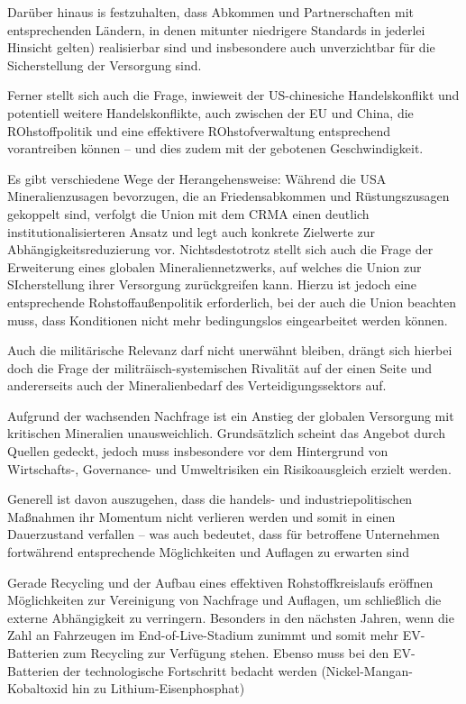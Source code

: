 \documentclass[12pt,a4paper,oneside]{book} %
\begin{document}
{Darüber hinaus is festzuhalten, dass Abkommen und Partnerschaften mit entsprechenden Ländern, in denen mitunter niedrigere Standards in jederlei Hinsicht gelten) realisierbar sind und insbesondere auch unverzichtbar für die Sicherstellung der Versorgung sind.

Ferner stellt sich auch die Frage, inwieweit der US-chinesiche Handelskonflikt und potentiell weitere Handelskonflikte, auch zwischen der EU und China, die ROhstoffpolitik und eine effektivere ROhstofverwaltung entsprechend vorantreiben können -- und dies zudem mit der gebotenen Geschwindigkeit.

Es gibt verschiedene Wege der Herangehensweise: Während die USA Mineralienzusagen bevorzugen, die an Friedensabkommen und Rüstungszusagen gekoppelt sind, verfolgt die Union mit dem CRMA einen deutlich institutionalisierteren Ansatz und legt auch konkrete Zielwerte zur Abhängigkeitsreduzierung vor. Nichtsdestotrotz stellt sich auch die Frage der Erweiterung eines globalen Mineraliennetzwerks, auf welches die Union zur SIcherstellung ihrer Versorgung zurückgreifen kann. Hierzu ist jedoch eine entsprechende Rohstoffaußenpolitik erforderlich, bei der auch die Union beachten muss, dass Konditionen nicht mehr bedingungslos eingearbeitet werden können. 

Auch die militärische Relevanz darf nicht unerwähnt bleiben, drängt sich hierbei doch die Frage der militräisch-systemischen Rivalität auf der einen Seite und andererseits auch der Mineralienbedarf des Verteidigungssektors auf.

Aufgrund der wachsenden Nachfrage ist ein Anstieg der globalen Versorgung mit kritischen Mineralien unausweichlich. Grundsätzlich scheint das Angebot durch Quellen gedeckt, jedoch muss insbesondere vor dem Hintergrund von Wirtschafts-, Governance- und Umweltrisiken ein Risikoausgleich erzielt werden. 

Generell ist davon auszugehen, dass die handels- und industriepolitischen Maßnahmen ihr Momentum nicht verlieren werden und somit in einen Dauerzustand verfallen -- was auch bedeutet, dass für betroffene Unternehmen fortwährend entsprechende Möglichkeiten und Auflagen zu erwarten sind

Gerade Recycling und der Aufbau eines effektiven Rohstoffkreislaufs eröffnen Möglichkeiten zur Vereinigung von Nachfrage und Auflagen, um schließlich die externe Abhängigkeit zu verringern. Besonders in den nächsten Jahren, wenn die Zahl an Fahrzeugen im End-of-Live-Stadium zunimmt und somit mehr EV-Batterien zum Recycling zur Verfügung stehen. Ebenso muss bei den EV-Batterien der technologische Fortschritt bedacht werden (Nickel-Mangan-Kobaltoxid hin zu Lithium-Eisenphosphat)

}
\end{document}
